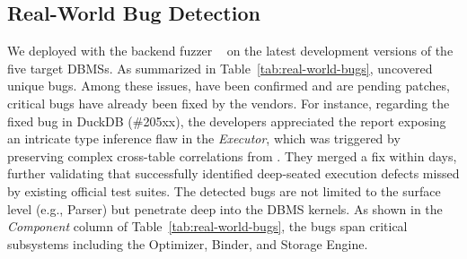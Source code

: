 \documentclass[sigconf,review,anonymous]{acmart}
\begin{document}
\subsection{Real-World Bug Detection}
We deployed \tool{} with the backend fuzzer \griffin{}~\cite{fu2022griffin} on the latest development versions of the five target DBMSs. As summarized in Table~\ref{tab:real-world-bugs}, \tool{} uncovered \bugcnt{} unique bugs. 
Among these issues, \bugconfirmcnt{} have been confirmed and are pending patches, \bugfixcnt{} critical bugs have already been fixed by the vendors. For instance, regarding the fixed bug in DuckDB (\#205xx), the developers appreciated the report exposing an intricate type inference flaw in the \textit{Executor}, which was triggered by preserving complex cross-table correlations from \pg{}. 
They merged a fix within days, further validating that \tool{} successfully identified deep-seated execution defects missed by existing official test suites.
The detected bugs are not limited to the surface level (e.g., Parser) but penetrate deep into the DBMS kernels. As shown in the \textit{Component} column of Table~\ref{tab:real-world-bugs}, the bugs span critical subsystems including the Optimizer, Binder, and Storage Engine.



\end{document}
